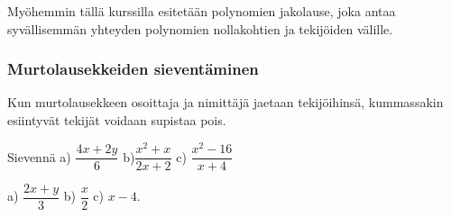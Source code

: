 Myöhemmin tällä kurssilla esitetään polynomien jakolause, joka antaa syvällisemmän yhteyden polynomien nollakohtien ja tekijöiden välille.

\subsubsection*{Murtolausekkeiden sieventäminen}

Kun murtolausekkeen osoittaja ja nimittäjä jaetaan tekijöihinsä,
kummassakin esiintyvät tekijät voidaan supistaa pois.

\begin{esimerkki}
    Sievennä \quad 
    a) $\dfrac{4x+2y}{6}$ \quad
    b)$\dfrac{x^2+x}{2x+2}$ \quad
    c) $\dfrac{x^2-16}{x+4}$
    \begin{esimratk}
        \begin{alakohdat}
        \end{alakohdat}
    \end{esimratk}
    \begin{esimvast}
        a) $\dfrac{2x+y}{3}$ \quad
        b) $\dfrac{x}{2}$ \quad
        c) $x-4$.
    \end{esimvast}
\end{esimerkki}

